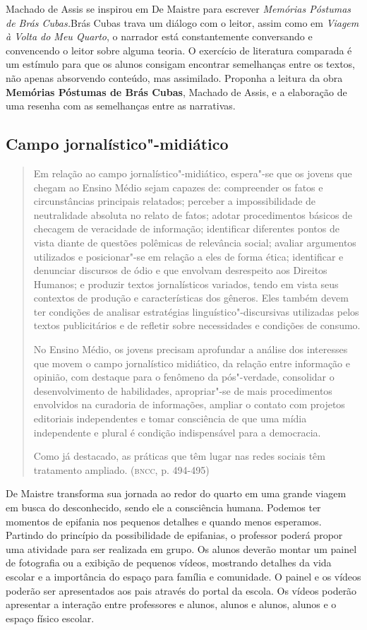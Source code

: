 \documentclass[12pt]{extarticle}
\begin{document}
Machado de Assis se inspirou em De Maistre para escrever
\emph{Memórias Póstumas de Brás Cubas.}Brás Cubas trava um diálogo com
o leitor, assim como em \emph{Viagem à Volta do Meu Quarto}, o
narrador está constantemente conversando e convencendo o leitor sobre
alguma teoria. O exercício de literatura comparada é um estímulo para
que os alunos consigam encontrar semelhanças entre os textos, não
apenas absorvendo conteúdo, mas assimilado. Proponha a leitura da obra
\textbf{Memórias Póstumas de Brás Cubas}, Machado de Assis, e a
elaboração de uma resenha com as semelhanças entre as narrativas.

\subsection{Campo jornalístico"-midiático}

\begin{quote}
Em relação ao campo jornalístico"-midiático, espera"-se que os jovens
que chegam ao Ensino Médio sejam capazes de: compreender os fatos e
circunstâncias principais relatados; perceber a impossibilidade de
neutralidade absoluta no relato de fatos; adotar procedimentos básicos
de checagem de veracidade de informação; identificar diferentes pontos
de vista diante de questões polêmicas de relevância social; avaliar
argumentos utilizados e posicionar"-se em relação a eles de forma ética;
identificar e denunciar discursos de ódio e que envolvam desrespeito aos
Direitos Humanos; e produzir textos jornalísticos variados, tendo em
vista seus contextos de produção e características dos gêneros. Eles
também devem ter condições de analisar estratégias
linguístico"-discursivas utilizadas pelos textos publicitários e de
refletir sobre necessidades e condições de consumo.

No Ensino Médio, os jovens precisam aprofundar a análise dos interesses
que movem o campo jornalístico midiático, da relação entre informação e
opinião, com destaque para o fenômeno da pós"-verdade, consolidar o
desenvolvimento de habilidades, apropriar"-se de mais procedimentos
envolvidos na curadoria de informações, ampliar o contato com projetos
editoriais independentes e tomar consciência de que uma mídia
independente e plural é condição indispensável para a democracia.

Como já destacado, as práticas que têm lugar nas redes sociais têm
tratamento ampliado. (\textsc{bncc}, p. 494-495)
\end{quote}

De Maistre transforma sua jornada ao redor do quarto em uma grande
viagem em busca do desconhecido, sendo ele a consciência humana.
Podemos ter momentos de epifania nos pequenos detalhes e quando menos
esperamos. Partindo do princípio da possibilidade de epifanias, o
professor poderá propor uma atividade para ser realizada em grupo. Os
alunos deverão montar um painel de fotografia ou a exibição de
pequenos vídeos, mostrando detalhes da vida escolar e a importância do
espaço para família e comunidade. O painel e os vídeos poderão ser
apresentados aos pais através do portal da escola. Os vídeos poderão
apresentar a interação entre professores e alunos, alunos e alunos,
alunos e o espaço físico escolar.
\end{document}
